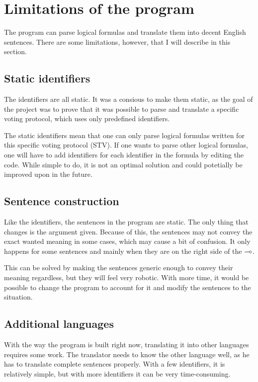 \section{Limitations of the program}
\label{04_04}

The program can parse logical formulas and translate them into decent English sentences. There are some limitations, however, that I will describe in this section.

\subsection{Static identifiers}
\label{04_04_01}

The identifiers are all static. It was a consious to make them static, as the goal of the project was to prove that it was possible to parse and translate a specific voting protocol, which uses only predefined identifiers.

The static identifiers mean that one can only parse logical formulas written for this specific voting protocol (STV). If one wants to parse other logical formulas, one will have to add identifiers for each identifier in the formula by editing the code. While simple to do, it is not an optimal solution and could potetially be improved upon in the future.

\subsection{Sentence construction}
\label{04_04_02}

Like the identifiers, the sentences in the program are static. The only thing that changes is the argument given. Because of this, the sentences may not convey the exact wanted meaning in some cases, which may cause a bit of confusion. It only happens for some sentences and mainly when they are on the right side of the $\multimap$.

This can be solved by making the sentences generic enough to convey their meaning regardless, but they will feel very robotic. With more time, it would be possible to change the program to account for it and modify the sentences to the situation.

\subsection{Additional languages}
\label{04_04_03}

With the way the program is built right now, translating it into other languages requires some work. The translator needs to know the other language well, as he has to translate complete sentences properly. With a few identifiers, it is relatively simple, but with more identifiers it can be very time-consuming.

